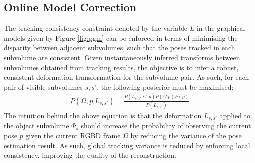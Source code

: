 \subsection{Online Model Correction}
\label{subsec:onlinemodelcorrection}

The tracking consistency constraint denoted by the variable $L$ in the graphical models given by Figure \ref{fig:pgm} can 
be enforced in terms of minimising the disparity between adjacent subvolumes, such that the poses tracked in each subvolume are consistent.  
Given instantaneously inferred transforms between subvolumes obtained from tracking results, 
the objective is to infer a robust, consistent deformation transformation for the subvolume pair.
As such, for each pair of visible subvolumes $s, s'$, the following posterior must be maximised:
\begin{equation}
\begin{split}
P(\Omega, p | L_{s, s'}) = \frac{P(L_{s, s'} | \Omega, p) P(\Omega | p)P(p)}
{P(L_{s, s'})}
\end{split}
\end{equation}
The intuition behind the above equation is that the deformation $L_{s, s'}$ applied to the object subvolume $\Phi_{s}$ should 
increase the probability of observing the current pose $p$ given the current RGBD frame $\Omega$ by reducing the 
variance of the pose estimation result. As such, global tracking variance is reduced by enforcing local consistency, improving the quality 
of the reconstruction.

